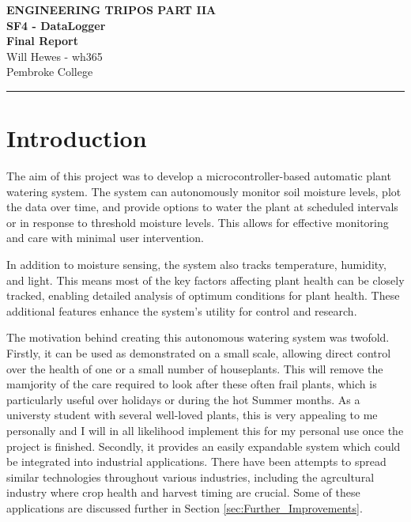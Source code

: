\documentclass[a4paper,11pt]{article}
\renewcommand{\maketitle}{
    \begin{center}
        \LARGE \textbf{ENGINEERING TRIPOS PART IIA} \\[0.5em]
        \Large \textbf{SF4 - DataLogger} \\[0.5em]
        \textbf{Final Report} \\[1.5em]
        \vspace{-1em}
        \small Will Hewes - wh365 \\ 
        Pembroke College \\ 
        \vspace{0.5em}
    \end{center}
}
\begin{document}

\maketitle
\hrule
\tableofcontents
\newpage

\section{Introduction}
\label{sec:Introduction}

The aim of this project was to develop a microcontroller-based 
automatic plant watering system.
The system can autonomously monitor soil moisture levels, 
plot the data over time, and provide options to water the plant
at scheduled intervals or in response to threshold moisture levels.
This allows for effective monitoring and care with minimal user intervention.

In addition to moisture sensing, the system also tracks
temperature, humidity, and light.
This means most of the key factors affecting plant health
can be closely tracked, enabling detailed analysis of
optimum conditions for plant health.
These additional features enhance the system's utility
for control and research.

The motivation behind creating this autonomous watering system was twofold. 
Firstly, it can be used as demonstrated on a small scale,
allowing direct control over the health of one 
or a small number of houseplants. 
This will remove the mamjority of the care required
to look after these often frail plants,
which is particularly useful over holidays or 
during the hot Summer months.
As a universty student with several well-loved plants,
this is very appealing to me personally
and I will in all likelihood implement this 
for my personal use once the project is finished.
Secondly, it provides an easily expandable system
which could be integrated into industrial applications.
There have been attempts to spread similar technologies 
throughout various industries, 
including the agrcultural industry where crop health 
and harvest timing are crucial. 
Some of these applications are discussed further in
Section \ref{sec:Further_Improvements}.
\end{document}
